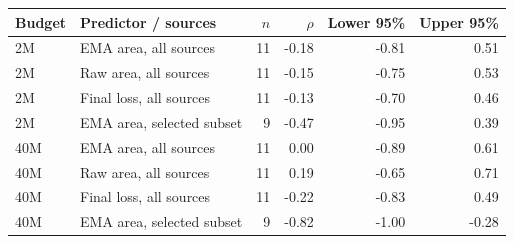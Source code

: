 \begin{tabular}{@{}llrrrr@{}}
\toprule
Budget & Predictor / sources & $n$ & $\rho$ & Lower 95\% & Upper 95\%\\
\midrule
2M & EMA area, all sources & 11 & -0.18 & -0.81 & 0.51 \\
2M & Raw area, all sources & 11 & -0.15 & -0.75 & 0.53 \\
2M & Final loss, all sources & 11 & -0.13 & -0.70 & 0.46 \\
2M & EMA area, selected subset & 9 & -0.47 & -0.95 & 0.39 \\
\midrule
40M & EMA area, all sources & 11 & 0.00 & -0.89 & 0.61 \\
40M & Raw area, all sources & 11 & 0.19 & -0.65 & 0.71 \\
40M & Final loss, all sources & 11 & -0.22 & -0.83 & 0.49 \\
40M & EMA area, selected subset & 9 & -0.82 & -1.00 & -0.28 \\
\bottomrule
\end{tabular}
